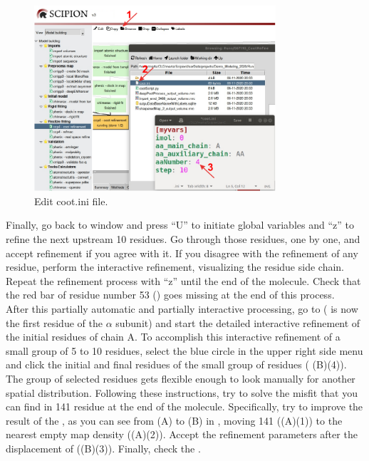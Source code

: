   \begin{figure}[H]
  \centering 
  \captionsetup{width=.7\linewidth} 
  \includegraphics[width=0.80\textwidth]{Images/cootini}
  \caption{Edit coot.ini file.}
  \label{fig:cootini}
  \end{figure}
  
 Finally, go back to \coot window and press ``U'' to initiate global variables and ``z'' to refine the next upstream 10 residues. Go through those residues, one by one, and accept refinement if you agree with it. If you disagree with the refinement of any residue, perform the interactive refinement, visualizing the residue side chain. Repeat the refinement process with ``z'' until the end of the molecule. Check that the red bar of residue number 53 () goes missing at the end of this process.\\
 
 After this partially automatic and partially interactive processing, go to  ( is now the first residue of the  $\alpha$ subunit) and start the detailed interactive refinement of the initial residues of chain A. To accomplish this interactive refinement of a small group of 5 to 10 residues, select the blue circle in the upper right side menu and click the initial and final residues of the small group of residues ( (B)(4)). The group of selected residues gets flexible enough to look manually for another spatial distribution. Following these instructions, try to solve the misfit that you can find in  141 residue at the end of the molecule. Specifically, try to improve the result of the , as you can see from (A) to (B) in , moving  141 ((A)(1)) to the nearest empty map density ((A)(2)). Accept the refinement parameters after the displacement of  ((B)(3)). Finally, check the .
 
